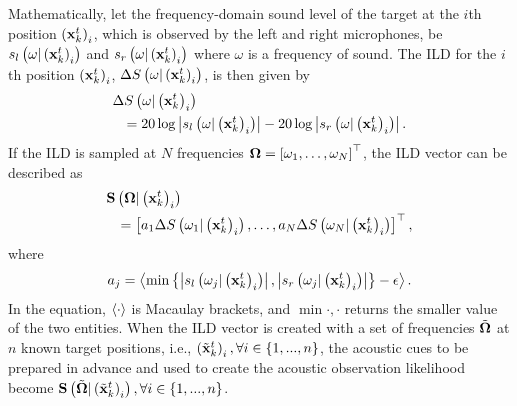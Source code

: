 Mathematically, let the frequency-domain sound \linebreak[4]level of the target at the $i$th position $\left ( \mathbf{x}_{k}^{t} \right )_{i}$, which is observed by the left and right microphones, be $s_l\left ( \omega|\left ( \mathbf{x}_{k}^{t} \right )_{i} \right )$ and $s_r\left ( \omega|\left ( \mathbf{x}_{k}^{t} \right )_{i} \right )$ where $\omega$ is a frequency of sound.  The ILD for the $i$th position $\left ( \mathbf{x}_{k}^{t} \right )_{i}$, $\Delta S\left ( \omega|\left ( \mathbf{x}_{k}^{t} \right )_i \right )$, is then given by 
\begin{eqnarray}\label{eq:ILD}
\lefteqn{\Delta S\bs{\omega|\bs{\Vxbp{k}{t}}_i}} \nonumber\\  &&= 20 \log \abs{s_l\bs{\omega|\bs{\Vxbp{k}{t}}_{i}}} - 20 \log \abs{s_r\bs{\omega|\bs{\Vxbp{k}{t}}_{i}}}.  
\end{eqnarray}
If the ILD is sampled at $N$ frequencies \small{$\mathbf{\Omega} = \left [ \omega_1,\ldots,\omega_N \right ]^\top$}, the ILD vector can be described as 
\begin{eqnarray}\label{eq:ILDs}
\lefteqn{\V{S}\bs{\V{\Omega}|\bs{\Vxbp{k}{t}}_i}}\nonumber\\ &&= \bl{a_1 \Delta S\bs{\omega_1|\bs{\Vxbp{k}{t}}_i},\ldots, a_N \Delta S\bs{\omega_N|\bs{\Vxbp{k}{t}}_i}}^\top,
\end{eqnarray}
where 
\begin{equation}
a_{j} = \left < \min\left \{ \left | s_l\left ( \omega_j|\left ( \mathbf{x}_{k}^{t} \right )_{i} \right ) \right |,\left | s_r\left ( \omega_j|\left ( \mathbf{x}_{k}^{t} \right )_{i} \right ) \right | \right \}-\epsilon \right >. 
\end{equation}
In the equation, $\left < \cdot \right >$ is Macaulay brackets, and $\min\bm{\cdot,\cdot}$ returns the smaller value of the two entities.  When the ILD vector is created with a set of frequencies $\mbox{$\tilde{\bf \Omega}$}$ at $n$ known target positions, i.e., $\left ( \tilde {\mathbf{x}}_{k}^{t} \right )_i, \forall i \in \left \{ 1,...,n \right \}$, the acoustic cues to be prepared in advance and used to create the acoustic observation likelihood become $\mathbf{S}\left ( \mbox{$\tilde{\bf \Omega}$}|\left ( \tilde {\mathbf{x}}_{k}^{t} \right )_i \right ), \forall i \in \left \{ 1,...,n \right \}$.  

